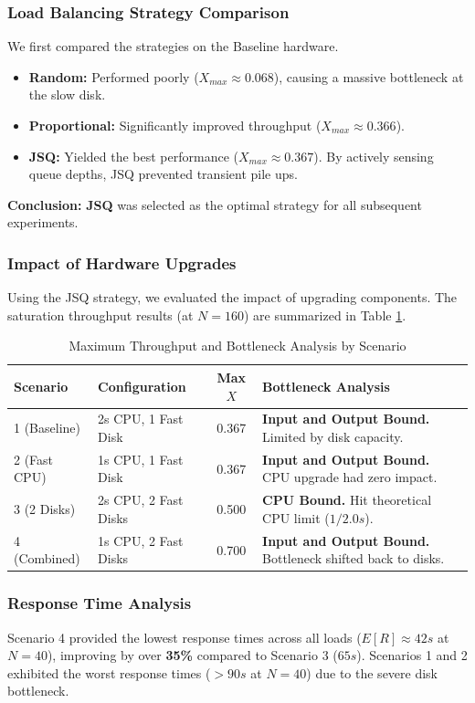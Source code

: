 \documentclass[a4paper,10pt]{article}
\begin{document}
\subsubsection{Load Balancing Strategy Comparison}
We first compared the strategies on the Baseline hardware.
\begin{itemize}
    \item \textbf{Random:} Performed poorly ($X_{max} \approx 0.068$), causing a massive bottleneck at the slow disk.
    \item \textbf{Proportional:} Significantly improved throughput ($X_{max} \approx 0.366$).
    \item \textbf{JSQ:} Yielded the best performance ($X_{max} \approx 0.367$). By actively sensing queue depths, JSQ prevented transient pile ups.
\end{itemize}
\textbf{Conclusion:} \textbf{JSQ} was selected as the optimal strategy for all subsequent experiments.

\subsubsection{Impact of Hardware Upgrades}
Using the JSQ strategy, we evaluated the impact of upgrading components. The saturation throughput results (at $N=160$) are summarized in Table \ref{tab:results}.

\begin{table}[ht]
\centering
\begin{tabular}{|l|l|c|l|}
\hline
\textbf{Scenario} & \textbf{Configuration} & \textbf{Max $X$} & \textbf{Bottleneck Analysis} \\ \hline
1 (Baseline) & 2s CPU, 1 Fast Disk & 0.367 & \textbf{Input and Output Bound.} Limited by disk capacity. \\ \hline
2 (Fast CPU) & 1s CPU, 1 Fast Disk & 0.367 & \textbf{Input and Output Bound.} CPU upgrade had zero impact. \\ \hline
3 (2 Disks) & 2s CPU, 2 Fast Disks & 0.500 & \textbf{CPU Bound.} Hit theoretical CPU limit ($1/2.0s$). \\ \hline
4 (Combined) & 1s CPU, 2 Fast Disks & 0.700 & \textbf{Input and Output Bound.} Bottleneck shifted back to disks. \\ \hline
\end{tabular}
\caption{Maximum Throughput and Bottleneck Analysis by Scenario}
\label{tab:results}
\end{table}

\subsubsection{Response Time Analysis}
Scenario 4 provided the lowest response times across all loads ($E[R] \approx 42s$ at $N=40$), improving by over \textbf{35\%} compared to Scenario 3 ($65s$). Scenarios 1 and 2 exhibited the worst response times ($>90s$ at $N=40$) due to the severe disk bottleneck.
\end{document}

